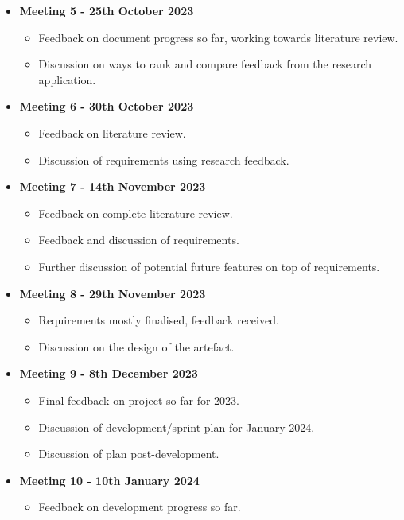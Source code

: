 \begin{itemize}
\begin{itemize}
    \end{itemize}
    \item \textbf{Meeting 5 - 25th October 2023}
    \begin{itemize}
        \item Feedback on document progress so far, working towards literature review.
        \item Discussion on ways to rank and compare feedback from the research application.
    \end{itemize}
    \item \textbf{Meeting 6 - 30th October 2023}
    \begin{itemize}
        \item Feedback on literature review.
        \item Discussion of requirements using research feedback.
    \end{itemize}
    \item \textbf{Meeting 7 - 14th November 2023}
    \begin{itemize}
        \item Feedback on complete literature review.
        \item Feedback and discussion of requirements.
        \item Further discussion of potential future features on top of requirements.
    \end{itemize}
    \item \textbf{Meeting 8 - 29th November 2023}
    \begin{itemize}
        \item Requirements mostly finalised, feedback received.
        \item Discussion on the design of the artefact.
    \end{itemize}
    \item \textbf{Meeting 9 - 8th December 2023}
    \begin{itemize}
        \item Final feedback on project so far for 2023.
        \item Discussion of development/sprint plan for January 2024.
        \item Discussion of plan post-development.
    \end{itemize}
    \item \textbf{Meeting 10 - 10th January 2024}
    \begin{itemize}
        \item Feedback on development progress so far.

\end{itemize}
\end{itemize}
